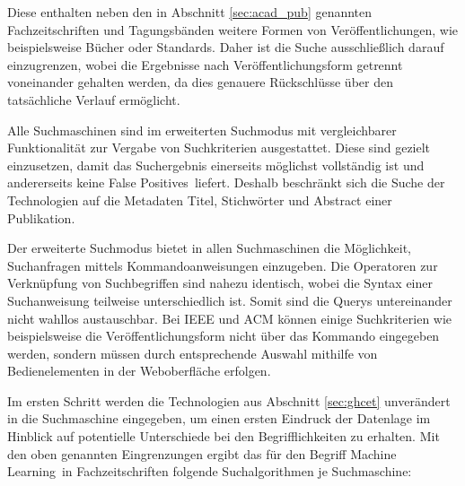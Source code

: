 Diese enthalten neben den in Abschnitt \ref{sec:acad_pub} genannten Fachzeitschriften und Tagungsbänden weitere Formen von Veröffentlichungen, wie beispielsweise Bücher oder Standards. Daher ist die Suche ausschließlich darauf einzugrenzen, wobei die Ergebnisse nach Veröffentlichungsform getrennt voneinander gehalten werden, da dies genauere Rückschlüsse über den tatsächliche Verlauf ermöglicht.

Alle Suchmaschinen sind im erweiterten Suchmodus mit vergleichbarer Funktionalität zur Vergabe von Suchkriterien ausgestattet. Diese sind gezielt einzusetzen, damit das Suchergebnis einerseits möglichst vollständig ist und andererseits keine \glqq False Positives\grqq~liefert. Deshalb beschränkt sich die Suche der Technologien auf die Metadaten Titel, Stichwörter und Abstract einer Publikation.

Der erweiterte Suchmodus bietet in allen Suchmaschinen die Möglichkeit, Suchanfragen mittels Kommandoanweisungen einzugeben. Die Operatoren zur Verknüpfung von Suchbegriffen sind nahezu identisch, wobei die Syntax einer Suchanweisung teilweise unterschiedlich ist. Somit sind die Querys untereinander nicht wahllos austauschbar. Bei IEEE und ACM können einige Suchkriterien wie beispielsweise die Veröffentlichungsform nicht über das Kommando eingegeben werden, sondern müssen durch entsprechende Auswahl mithilfe von Bedienelementen in der Web\-oberfläche erfolgen.

Im ersten Schritt werden die Technologien aus Abschnitt \ref{sec:ghcet} unverändert in die Suchmaschine eingegeben, um einen ersten Eindruck der Datenlage im Hinblick auf potentielle Unterschiede bei den Begrifflichkeiten zu erhalten. Mit den oben genannten Eingrenzungen ergibt das für den Begriff \glqq Machine Learning\grqq~in Fachzeitschriften folgende Suchalgorithmen je Suchmaschine:

